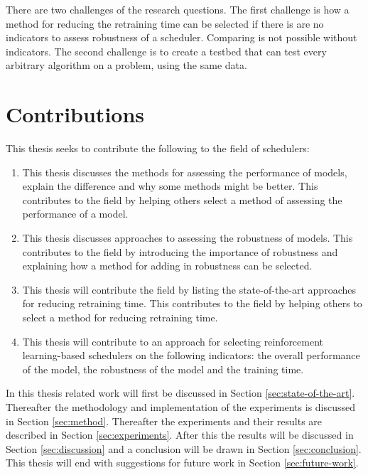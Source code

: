 There are two challenges of the research questions. The first challenge is how
a method for reducing the retraining time can be selected if there is are no
indicators to assess robustness of a \rlbased scheduler. Comparing is not
possible without indicators. The second challenge is to create a testbed that
can test every arbitrary \rl algorithm on a \jss problem, using the same data.


\section{Contributions}

This thesis seeks to contribute the following to the field of \rlbased
schedulers:

\begin{enumerate}[noitemsep]
    \item This thesis discusses the methods for assessing the performance
        of \rl models, explain the difference and why some methods might be
        better. This contributes to the field by helping others select a
        method of assessing the performance of a \rl model.
    \item This thesis discusses approaches to assessing the robustness of
        \rl models. This contributes to the field by introducing the
        importance of robustness and explaining how a method for adding in
        robustness can be selected.
    \item This thesis will contribute the field by listing the
        state-of-the-art approaches for reducing retraining time. This
        contributes to the field by helping others to select a method for
        reducing retraining time.
    \item This thesis will contribute to an approach for selecting
        reinforcement learning-based schedulers on the following indicators:
        the overall performance of the model, the robustness of the model and
        the training time.
\end{enumerate}


In this thesis related work will first be discussed in Section
\ref{sec:state-of-the-art}. Thereafter the methodology and implementation of
the experiments is discussed in Section \ref{sec:method}. Thereafter the
experiments and their results are described in Section
\ref{sec:experiments}. After this the results will be discussed in Section
\ref{sec:discussion} and a conclusion will be drawn in Section
\ref{sec:conclusion}. This thesis will end with suggestions for future work in
Section \ref{sec:future-work}.
